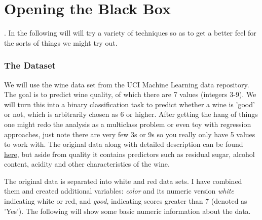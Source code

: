 



\part{Opening the Black Box}

.  In the following will will try a variety of techniques so as to get a better feel for the sorts of things we might try out.

\section{The Dataset}
We will use the wine data set from the UCI Machine Learning data repository.  The goal is to predict wine quality, of which there are 7 values (integers 3-9).  We will turn this into a binary classification task to predict whether a wine is 'good' or not, which is arbitrarily chosen as 6 or higher.  After getting the hang of things one might redo the analysis as a multiclass problem or even toy with regression approaches, just note there are very few 3s or 9s so you really only have 5 values to work with.  The original data along with detailed description can be found \href{http://archive.ics.uci.edu/ml/datasets/Wine+Quality}{here}, but aside from quality it contains predictors such as residual sugar, alcohol content, acidity and other characteristics of the wine.

The original data is separated into white and red data sets. I have combined them and created additional variables: \emph{color} and its numeric version \emph{white} indicating white or red, and \emph{good}, indicating scores greater than 7 (denoted as 'Yes').  The following will show some basic numeric information about the data.

